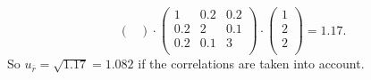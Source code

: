 \begin{derivation}
\begin{enumerate}[label=\alph*)]
\begin{equation*}
\begin{pmatrix}
            \end{pmatrix} \cdot \begin{pmatrix}
              1 & \num{0,2}  & \num{0,2} \\
            \num{0,2}  & 2 & \num{0,1} \\
            \num{0,2}  & \num{0,1}  & 3\\
            \end{pmatrix} \cdot \begin{pmatrix}
              1\\
            2\\
            2\\
            \end{pmatrix} = \num{1,17}
          .\end{equation*}
          So $u_{\overline{r}} = \sqrt{\num{1,17}}  = \num{1,082}$ if the correlations are taken into account.
      \end{enumerate}
    \end{derivation}


